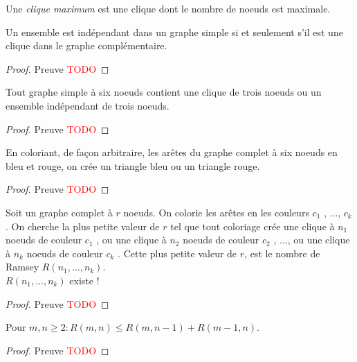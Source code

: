 \begin{mydef}
  Une \emph{clique maximum} est une clique dont le nombre de noeuds est maximale.
\end{mydef}

\begin{mytheo}
  Un ensemble est indépendant dans un graphe simple si et seulement s’il est une clique dans le graphe complémentaire.
  \begin{proof}
     Preuve \textcolor{red}{TODO}
  \end{proof}
\end{mytheo}

\begin{mytheo} 
  Tout graphe simple à six noeuds contient une clique de trois noeuds ou un ensemble indépendant de trois noeuds.
  \begin{proof}
     Preuve \textcolor{red}{TODO}
  \end{proof}
\end{mytheo}

\begin{mytheo} 
  En coloriant, de façon arbitraire, les arêtes du graphe complet à six noeuds en bleu et rouge, on crée un triangle bleu ou un triangle rouge.
  \begin{proof}
     Preuve \textcolor{red}{TODO}
  \end{proof}
\end{mytheo}

\begin{mytheo} 
  Soit un graphe complet à $r$ noeuds. On colorie les arêtes en les couleurs $c_1$ , ..., $c_k$ . On cherche la plus petite valeur de $r$ tel que tout coloriage crée une clique à $n_1$ noeuds de couleur $c_1$ , ou une clique à $n_2$ noeuds de couleur $c_2$ , ..., ou une clique à $n_k$ noeuds de couleur $c_k$ . Cette plus petite valeur de $r$, est le nombre de Ramsey $R(n_1 , ..., n_k)$.\\
  $R(n_1 , ..., n_k)$ existe !
  \begin{proof}
     Preuve \textcolor{red}{TODO}
  \end{proof}
\end{mytheo}

\begin{mytheo} 
  Pour $m, n \geq 2: R(m, n) \leq R(m, n-1) + R(m-1, n)$.
  \begin{proof}
     Preuve \textcolor{red}{TODO}
  \end{proof}
\end{mytheo}

